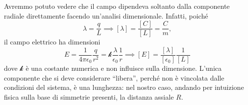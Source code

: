 \begin{observe}
	Avremmo potuto vedere che il campo dipendeva soltanto dalla componente radiale direttamente facendo un'analisi dimensionale. Infatti, poiché
	\begin{equation*}
		\lambda=\frac{q}{L}\implies\left[\lambda\right]=\frac{\left[C\right]}{\left[L\right]}=\frac{C}{m},
	\end{equation*}
	il campo elettrico ha dimensioni
	\begin{equation*}
		E=\frac{1}{4\pi\epsilon_0}\frac{q}{r^2}=\mathcal{k}\frac{\lambda}{\epsilon_0}\frac{1}{r}\implies\left[E\right]=\frac{\left[\lambda\right]}{\left[\epsilon_0\right]}\frac{1}{\left[L\right]}
	\end{equation*}
dove $\mathcal{k}$ è una costante numerica e non influisce sulla dimensione. L'unica componente che si deve considerare ``libera'', perché non è vincolata dalle condizioni del sistema, è una lunghezza: nel nostro caso, andando per intuizione fisica sulla base di simmetrie presenti, la distanza assiale $R$.
\end{observe}
